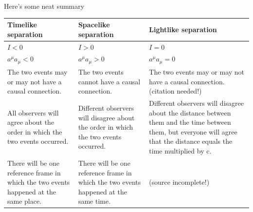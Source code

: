 \documentclass[../main.tex]{subfiles}
\begin{document}
Here's some neat summary
\begin{center}
        \begin{longtable}{ |p{}|p{} |p{}| }
            \hline
            Timelike separation&Spacelike separation&Lightlike separation\\
            \hline
            $I < 0$&$I > 0$&$I = 0$\\
            $a^\mu a_\mu<0$&$a^\mu a_\mu>0$&$a^\mu a_\mu=0$\\
            The two events may or may not have a causal connection.&The two events cannot have a causal
            connection.&The two events may or may not have a causal connection.(citation needed!)\\
            All observers will agree about the order in which the two events occurred.&Different observers will disagree about the order in which the two events occurred.&Different observers will disagree about the distance between them and the time between them, but everyone will agree that the distance equals the time multiplied by c.\\
            There will be one reference frame in which the two events happened at the same place.&There will be one reference frame in which the two events happened at the same time.&(source incomplete!)\\
            \hline
        \end{longtable}
\end{center}
\end{document}
